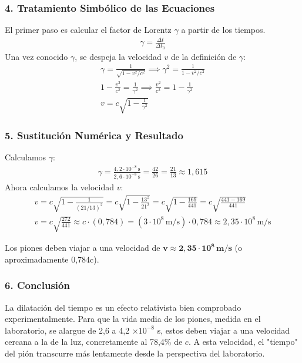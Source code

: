 \subsubsection*{4. Tratamiento Simbólico de las Ecuaciones}
El primer paso es calcular el factor de Lorentz $\gamma$ a partir de los tiempos.
\begin{gather}
    \gamma = \frac{\Delta t}{\Delta t_0}
\end{gather}
Una vez conocido $\gamma$, se despeja la velocidad $v$ de la definición de $\gamma$:
\begin{gather}
    \gamma = \frac{1}{\sqrt{1 - v^2/c^2}} \implies \gamma^2 = \frac{1}{1 - v^2/c^2} \nonumber \\
    1 - \frac{v^2}{c^2} = \frac{1}{\gamma^2} \implies \frac{v^2}{c^2} = 1 - \frac{1}{\gamma^2} \nonumber \\
    v = c \sqrt{1 - \frac{1}{\gamma^2}}
\end{gather}

\subsubsection*{5. Sustitución Numérica y Resultado}
Calculamos $\gamma$:
\begin{gather}
    \gamma = \frac{4,2 \cdot 10^{-8} \, \text{s}}{2,6 \cdot 10^{-8} \, \text{s}} = \frac{42}{26} = \frac{21}{13} \approx 1,615
\end{gather}
Ahora calculamos la velocidad $v$:
\begin{gather}
    v = c \sqrt{1 - \frac{1}{(21/13)^2}} = c \sqrt{1 - \frac{13^2}{21^2}} = c \sqrt{1 - \frac{169}{441}} = c \sqrt{\frac{441 - 169}{441}} \nonumber \\
    v = c \sqrt{\frac{272}{441}} \approx c \cdot (0,784) = (3 \cdot 10^8 \, \text{m/s}) \cdot 0,784 \approx 2,35 \cdot 10^8 \, \text{m/s}
\end{gather}
\begin{cajaresultado}
    Los piones deben viajar a una velocidad de $\boldsymbol{v \approx 2,35 \cdot 10^8 \, \textbf{m/s}}$ (o aproximadamente 0,784c).
\end{cajaresultado}

\subsubsection*{6. Conclusión}
\begin{cajaconclusion}
La dilatación del tiempo es un efecto relativista bien comprobado experimentalmente. Para que la vida media de los piones, medida en el laboratorio, se alargue de 2,6 a 4,2 $\times 10^{-8}$ s, estos deben viajar a una velocidad cercana a la de la luz, concretamente al 78,4\% de $c$. A esta velocidad, el "tiempo" del pión transcurre más lentamente desde la perspectiva del laboratorio.
\end{cajaconclusion}

